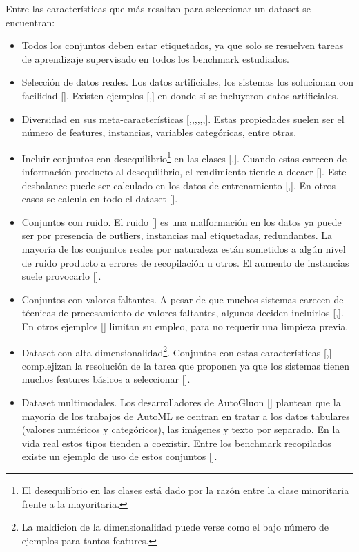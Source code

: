 Entre las características que más resaltan para seleccionar un dataset se encuentran:
\begin{itemize}
    \item Todos los conjuntos deben estar etiquetados, ya que solo se resuelven tareas de aprendizaje supervisado en todos los benchmark estudiados.
    \item Selección de datos reales. Los datos artificiales, los sistemas los solucionan con facilidad [\cite{15}]. Existen ejemplos [\cite{10},\cite{16}] en donde sí 
    se incluyeron datos artificiales. 
    \item Diversidad en sus meta-características [\cite{10},\cite{15},\cite{16},\cite{17},\cite{18},\cite{22},\cite{28}]. Estas propiedades suelen ser
    el número de features, instancias, variables categóricas, entre otras.
    \item Incluir conjuntos con desequilibrio\footnote{El desequilibrio en las clases está dado por la razón entre la clase minoritaria frente a la mayoritaria.} en 
    las clases [\cite{16},\cite{31}]. Cuando estas carecen de información producto al desequilibrio, el rendimiento tiende a decaer [\cite{16}]. Este desbalance puede 
    ser calculado en los datos de entrenamiento [\cite{11},\cite{29}]. En otros casos se calcula en todo el dataset [\cite{31}]. 
    \item Conjuntos con ruido. El ruido [\cite{47}] es una malformación en los datos ya puede ser por presencia de outliers, instancias mal etiquetadas, 
    redundantes. La mayoría de los conjuntos reales por naturaleza están sometidos a algún nivel de ruido producto a errores de recopilación u otros. 
    El aumento de instancias suele provocarlo [\cite{24}]. 
    \item Conjuntos con valores faltantes. A pesar de que muchos sistemas carecen de técnicas de procesamiento de valores faltantes, algunos deciden incluirlos 
    [\cite{10},\cite{11}]. En otros ejemplos [\cite{18}] limitan su empleo, para no requerir una limpieza previa.
    \item Dataset con alta dimensionalidad\footnote{La maldicion de la dimensionalidad puede verse como el bajo número de ejemplos para tantos features.}. 
    Conjuntos con estas características [\cite{11},\cite{24}] complejizan la resolución de la tarea que proponen ya que los sistemas tienen muchos features básicos 
    a seleccionar [\cite{47}].
    \item Dataset multimodales. Los desarrolladores de AutoGluon [\cite{42}] plantean que la mayoría de los trabajos de AutoML se centran en tratar a los datos 
    tabulares (valores numéricos y categóricos), las imágenes y texto por separado. En la vida real estos tipos tienden a coexistir. Entre los benchmark recopilados 
    existe un ejemplo de uso de estos conjuntos [\cite{27}]. 
   
    \end{itemize} 
